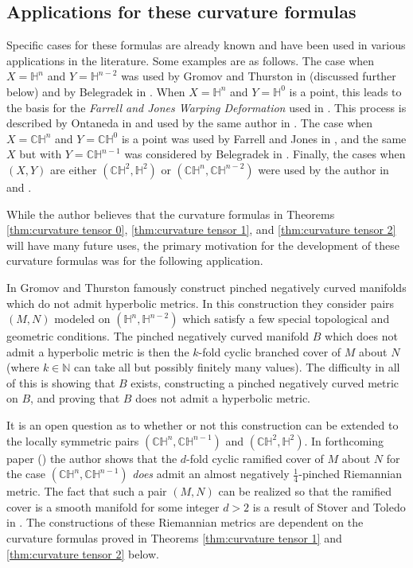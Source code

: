 \documentclass[10pt]{amsart}
\def\H{\mathbb{H}}
\def\C{\mathbb{C}}
\theoremstyle{definition}
\theoremstyle{remark}
\numberwithin{equation}{section}
\begin{document}
\subsection{Applications for these curvature formulas}

Specific cases for these formulas are already known and have been used in various applications in the literature.  
Some examples are as follows.  
The case when $X = \H^n$ and $Y = \H^{n-2}$ was used by Gromov and Thurston in \cite{GT} (discussed further below) and by Belegradek in \cite{Belegradek real}.  
When $X = \H^n$ and $Y = \H^0$ is a point, this leads to the basis for the {\it Farrell and Jones Warping Deformation} used in \cite{FJ2}.  
This process is described by Ontaneda in \cite{Ontaneda 1} and used by the same author in \cite{Ontaneda 2}.  
The case when $X = \C \H^n$ and $Y = \C \H^0$ is a point was used by Farrell and Jones in \cite{FJ}, and the same $X$ but with $Y = \C \H^{n-1}$ was considered by Belegradek in \cite{Belegradek complex}.  
Finally, the cases when $(X,Y)$ are either $(\C \H^2, \H^2)$ or $(\C \H^n, \C \H^{n-2})$ were used by the author in \cite{Min} and \cite{Min negative distribution}.  

While the author believes that the curvature formulas in Theorems \ref{thm:curvature tensor 0}, \ref{thm:curvature tensor 1}, and \ref{thm:curvature tensor 2} will have many future uses, the primary motivation for the development of these curvature formulas was for the following application.  


In \cite{GT} Gromov and Thurston famously construct pinched negatively curved manifolds which do not admit hyperbolic metrics.  
In this construction they consider pairs $(M, N)$ modeled on $(\H^n, \H^{n-2})$ which satisfy a few special topological and geometric conditions.
The pinched negatively curved manifold $B$ which does not admit a hyperbolic metric is then the $k$-fold cyclic branched cover of $M$ about $N$ (where $k \in \mathbb{N}$ can take all but possibly finitely many values).  
The difficulty in all of this is showing that $B$ exists, constructing a pinched negatively curved metric on $B$, and proving that $B$ does not admit a hyperbolic metric.

It is an open question as to whether or not this construction can be extended to the locally symmetric pairs $(\C \H^n, \C \H^{n-1})$ and $(\C \H^2, \H^2)$.
In forthcoming paper (\cite{Min complex metric}) the author shows that the $d$-fold cyclic ramified cover of $M$ about $N$ for the case $(\C \H^n, \C \H^{n-1})$ {\it does} admit an almost negatively $\frac{1}{4}$-pinched Riemannian metric.
The fact that such a pair $(M,N)$ can be realized so that the ramified cover is a smooth manifold for some integer $d > 2$ is a result of Stover and Toledo in \cite{ST}.  
The constructions of these Riemannian metrics are dependent on the curvature formulas proved in Theorems \ref{thm:curvature tensor 1} and \ref{thm:curvature tensor 2} below.
\end{document}
